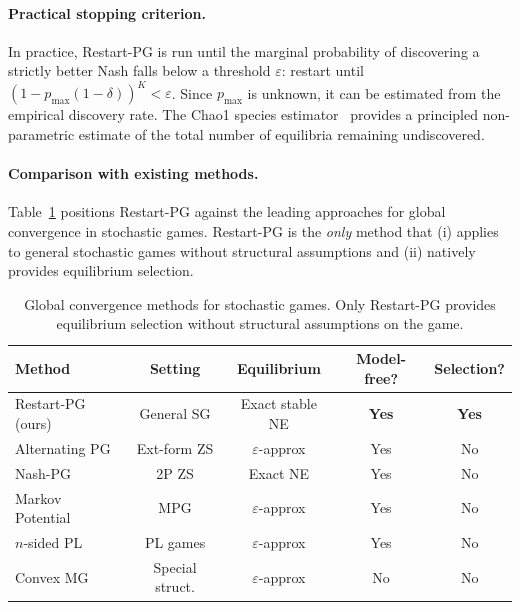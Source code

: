 \documentclass{article}
\begin{document}
\paragraph{Practical stopping criterion.}
In practice, Restart-PG is run until the marginal probability of
discovering a strictly better Nash falls below a threshold $\varepsilon$:
restart until $(1 - p_{\max}(1-\delta))^K < \varepsilon$.
Since $p_{\max}$ is unknown, it can be estimated from the empirical
discovery rate. The Chao1 species estimator~\cite{chao1984} provides
a principled non-parametric estimate of the total number of equilibria
remaining undiscovered.

\paragraph{Comparison with existing methods.}
Table~\ref{tab:comparison} positions Restart-PG against the leading
approaches for global convergence in stochastic games. Restart-PG is
the \emph{only} method that (i) applies to general stochastic games
without structural assumptions and (ii) natively provides
equilibrium selection.

\begin{table}[h]
\centering
\caption{Global convergence methods for stochastic games. Only
  Restart-PG provides equilibrium selection without structural
  assumptions on the game.}
\label{tab:comparison}
\small
\begin{tabular}{lcccc}
\toprule
\textbf{Method} & \textbf{Setting} & \textbf{Equilibrium}
  & \textbf{Model-free?} & \textbf{Selection?} \\
\midrule
Restart-PG (ours) & General SG & Exact stable NE & \textbf{Yes} & \textbf{Yes} \\
Alternating PG \cite{kalogiannis2025} & Ext-form ZS & $\varepsilon$-approx & Yes & No \\
Nash-PG \cite{nashpg2025} & 2P ZS & Exact NE & Yes & No \\
Markov Potential \cite{leonardos2022} & MPG & $\varepsilon$-approx & Yes & No \\
$n$-sided PL \cite{chao2026} & PL games & $\varepsilon$-approx & Yes & No \\
Convex MG & Special struct. & $\varepsilon$-approx & No & No \\
\bottomrule
\end{tabular}
\end{table}

\end{document}
